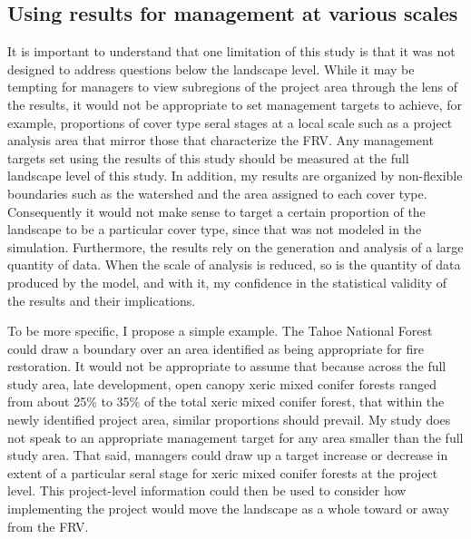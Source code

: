 \subsection{Using results for management at various scales}
It is important to understand that one limitation of this study is that it was not designed to address questions below the landscape level. While it may be tempting for managers to view subregions of the project area through the lens of the results, it would not be appropriate to set management targets to achieve, for example, proportions of cover type seral stages at a local scale such as a project analysis area that mirror those that characterize the FRV. Any management targets set using the results of this study should be measured at the full landscape level of this study. In addition, my results are organized by non-flexible boundaries such as the watershed and the area assigned to each cover type. Consequently it would not make sense to target a certain proportion of the landscape to be a particular cover type, since that was not modeled in the simulation. Furthermore, the results rely on the generation and analysis of a large quantity of data. When the scale of analysis is reduced, so is the quantity of data produced by the model, and with it, my confidence in the statistical validity of the results and their implications. 

To be more specific, I propose a simple example. The Tahoe National Forest could draw a boundary over an area identified as being appropriate for fire restoration. It would not be appropriate to assume that because across the full study area, late development, open canopy xeric mixed conifer forests ranged from about 25\% to 35\% of the total xeric mixed conifer forest, that within the newly identified project area, similar proportions should prevail. My study does not speak to an appropriate management target for any area smaller than the full study area. That said, managers could draw up a target increase or decrease in extent of a particular seral stage for xeric mixed conifer forests at the project level. This project-level information could then be used to consider how implementing the project would move the landscape as a whole toward or away from the FRV. 

